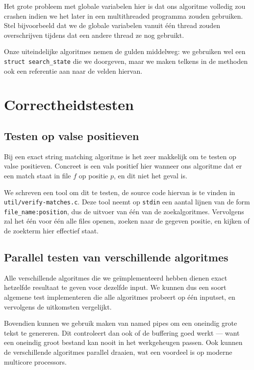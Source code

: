 \documentclass[a4paper,11pt]{article}
\begin{document}
Het grote probleem met globale variabelen hier is dat ons algoritme volledig zou
crashen indien we het later in een multithreaded programma zouden gebruiken.
Stel bijvoorbeeld dat we de globale variabelen vanuit \'e\'en thread zouden
overschrijven tijdens dat een andere thread ze nog gebruikt.

Onze uiteindelijke algoritmes nemen de gulden middelweg: we gebruiken wel een
\verb#struct search_state# die we doorgeven, maar we maken telkens in de
methoden ook een referentie aan naar de velden hiervan.

\section{Correctheidstesten}

\subsection{Testen op valse positieven}

Bij een exact string matching algoritme is het zeer makkelijk om te testen op
valse positieven. Concreet is een vals positief hier wanneer ons algoritme dat
er een match staat in file $f$ op positie $p$, en dit niet het geval is.

We schreven een tool om dit te testen, de source code hiervan is te vinden in
\verb#util/verify-matches.c#. Deze tool neemt op \verb#stdin# een aantal lijnen
van de form \verb#file_name:position#, dus de uitvoer van \'e\'en van de
zoekalgoritmes. Vervolgens zal het \'e\'en voor \'e\'en alle files openen,
zoeken naar de gegeven positie, en kijken of de zoekterm hier effectief staat.

\subsection{Parallel testen van verschillende algoritmes}

Alle verschillende algoritmes die we ge\"implementeerd hebben dienen exact
hetzelfde resultaat te geven voor dezelfde input. We kunnen dus een soort
algemene test implementeren die alle algoritmes probeert op \'e\'en inputset, en
vervolgens de uitkomsten vergelijkt.

Bovendien kunnen we gebruik maken van named pipes om een oneindig grote tekst
te genereren. Dit controleert dan ook of de buffering goed werkt — want een
oneindig groot bestand kan nooit in het werkgeheugen passen. Ook kunnen de
verschillende algoritmes parallel draaien, wat een voordeel is op moderne
multicore processors.
\end{document}

